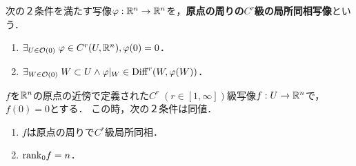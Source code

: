 \documentclass[uplatex,dvipdfmx]{jsreport}
\begin{document}
\begin{definition}[局所同相]
    次の２条件を満たす写像$\varphi:\mathbb{R}^n\to\mathbb{R}^n$を，\textbf{原点の周りの$C^r$級の局所同相写像}という．
    \begin{enumerate}
        \item $\exists_{U\in\mathcal{O}(0)}\;\varphi\in C^r(U,\mathbb{R}^n),\varphi(0)=0$．
        \item $\exists_{W\in\mathcal{O}(0)}\;W\subset U\land \varphi|_W\in\mathrm{Diff}^r(W,\varphi(W))$．
    \end{enumerate}
\end{definition}

\begin{theorem}[逆写像定理]
    $f$を$\mathbb{R}^n$の原点の近傍で定義された$C^r\;(r\in[1,\infty])$級写像$f:U\to\mathbb{R}^n$で，$f(0)=0$とする．
    この時，次の２条件は同値．
    \begin{enumerate}
        \item $f$は原点の周りで$C^r$級局所同相．
        \item $\mathrm{rank}_0f=n$．
    \end{enumerate}
\end{theorem}
\end{document}
